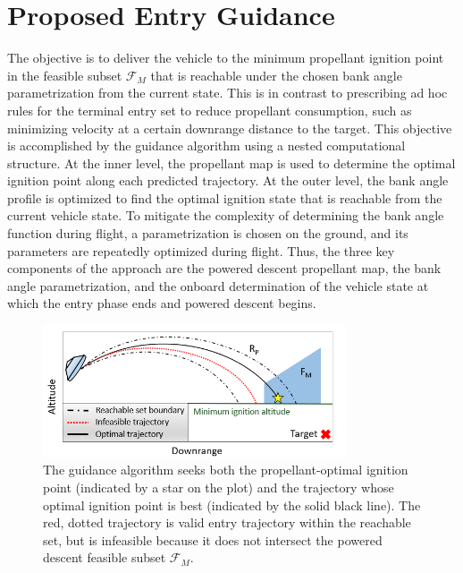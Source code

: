 \documentclass[letterpaper, paper,11pt]{AAS}
\begin{document}
\section{Proposed Entry Guidance}


The objective is to deliver the vehicle to the minimum propellant ignition point in the feasible subset $\mathcal{F}_M$ that is reachable under the chosen bank angle parametrization from the current state. This is in contrast to prescribing ad hoc rules for the terminal entry set to reduce propellant consumption, such as minimizing velocity at a certain downrange distance to the target. 
This objective is accomplished by the guidance algorithm using a nested computational structure. At the inner level, the propellant map is used to determine the optimal ignition point along each predicted trajectory. At the outer level, the bank angle profile is optimized to find the optimal ignition state that is reachable from the current vehicle state. To mitigate the complexity of determining the bank angle function during flight, a parametrization is chosen on the ground, and its parameters are repeatedly optimized during flight. Thus, the three key components of the approach are the powered descent propellant map, the bank angle parametrization, and the onboard determination of the vehicle state at which the entry phase ends and powered descent begins.  

\begin{figure}[h!]
	\centering
	\includegraphics[width=0.8\textwidth]{Optimization} 
	\caption{The guidance algorithm seeks both the propellant-optimal ignition point (indicated by a star on the plot) and the trajectory whose optimal ignition point is best (indicated by the solid black line). The red, dotted trajectory is valid entry trajectory within the reachable set, but is infeasible because it does not intersect the powered descent feasible subset $\mathcal{F}_M$.}
	\label{fig_optimization}
\end{figure}
\end{document}

